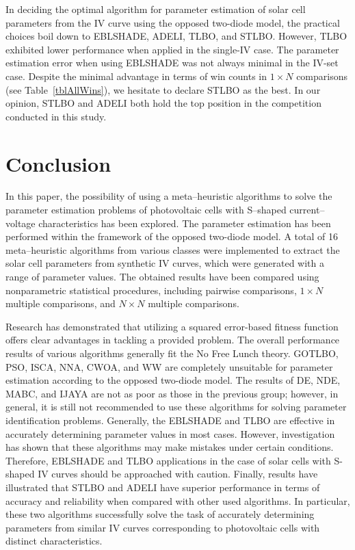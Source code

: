 \documentclass[a4paper,fleqn]{cas-dc}
\begin{document}
In deciding the optimal algorithm for parameter estimation of solar cell parameters
from the IV curve using the opposed two-diode model,
the practical choices boil down to EBLSHADE, ADELI, TLBO, and STLBO.
However, TLBO exhibited lower performance when applied in the single-IV case.
The parameter estimation error when using EBLSHADE was not always minimal in the IV-set case.
Despite the minimal advantage in terms of win counts in $1\times N$ comparisons
(see Table~\ref{tblAllWins}),
we hesitate to declare STLBO as the best.
In our opinion, STLBO and ADELI both hold the top position in the competition conducted in this study.





\section{Conclusion}

In this paper, the possibility of using a meta--heuristic algorithms
to solve the parameter estimation problems of photovoltaic cells
with S--shaped current--voltage characteristics has been explored.
The parameter estimation has been performed within the framework of the opposed two-diode model.
A total of 16 meta--heuristic algorithms from various classes were implemented
to extract the solar cell parameters from synthetic IV curves, which were generated with a range of parameter values.
The obtained results have been compared using nonparametric statistical procedures,
including pairwise comparisons, $1\times N$ multiple comparisons, and $N\times N$ multiple comparisons.

Research has demonstrated that utilizing a squared error-based fitness function offers clear advantages in tackling a provided problem.
The overall performance results of various algorithms generally fit the No Free Lunch theory.
GOTLBO, PSO, ISCA, NNA, CWOA, and WW are completely unsuitable for parameter estimation according to the opposed two-diode model.
The results of DE, NDE, MABC, and IJAYA are not as poor as those in the previous group;
however, in general, it is still not recommended to use these algorithms for solving parameter identification problems.
Generally, the EBLSHADE and TLBO are effective in accurately determining parameter values in most cases.
However, investigation has shown that these algorithms may make mistakes under certain conditions.
Therefore, EBLSHADE and TLBO applications in the case of solar cells with S-shaped IV curves should be approached with caution.
Finally, results have illustrated that STLBO and ADELI have superior performance in terms of accuracy and reliability
when compared with other used algorithms.
In particular, these two algorithms successfully solve the task of accurately determining parameters
from similar IV curves corresponding to photovoltaic cells with distinct characteristics.
\end{document}

